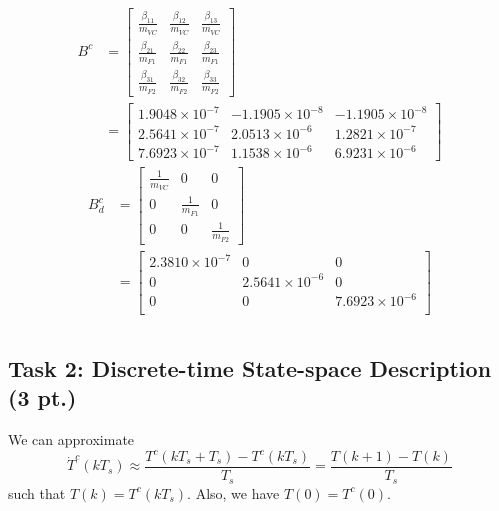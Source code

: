 \documentclass[a4paper,twoside,11pt]{article}
\numberwithin{equation}{section}
\begin{document}
\begin{equation*}
\begin{split}
    B^c &= 
    \begin{bmatrix}
    \frac{\beta_{11}}{m_{VC}} & \frac{\beta_{12}}{m_{VC}} & \frac{\beta_{13}}{m_{VC}} \\
    \frac{\beta_{21}}{m_{F1}} & \frac{\beta_{22}}{m_{F1}} & \frac{\beta_{23}}{m_{F1}} \\
    \frac{\beta_{31}}{m_{F2}} & \frac{\beta_{32}}{m_{F2}} & \frac{\beta_{33}}{m_{F2}} 
    \end{bmatrix} \\
    &=
    \begin{bmatrix}
    1.9048\times10^{-7} & -1.1905\times10^{-8} & -1.1905\times10^{-8}\\
    2.5641\times10^{-7} & 2.0513\times10^{-6} & 1.2821\times10^{-7}\\
    7.6923\times10^{-7} & 1.1538\times10^{-6} & 6.9231\times10^{-6}
    \end{bmatrix}
\end{split}
\end{equation*}
\begin{equation*}
\begin{split}
     B^c_d &= 
    \begin{bmatrix}
    \frac{1}{m_{VC}} & 0 & 0 \\
    0 & \frac{1}{m_{F1}} & 0 \\
    0 & 0 & \frac{1}{m_{F2}} 
    \end{bmatrix} \\
    &=
    \begin{bmatrix}
    2.3810\times10^{-7} & 0 & 0 \\
    0 & 2.5641\times10^{-6} & 0 \\
    0 & 0 & 7.6923\times10^{-6} \\
    \end{bmatrix} \\
\end{split}
\end{equation*}
   
\subsection{Task 2: Discrete-time State-space Description (3 pt.)}

We can approximate 
\begin{equation}
    \dot{T}^c(kT_s) \approx \frac{T^c(kT_s+T_s) - T^c(kT_s)}{T_s} = \frac{T(k+1)-T(k)}{T_s}
\end{equation}
such that $T(k) = T^c(kT_s)$. Also, we have $T(0) = T^c(0)$.
\end{document}
